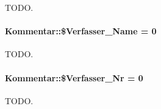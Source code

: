 TODO. 

\hypertarget{classKommentar_84f0fc10295968adde28169f8df018d9}{
\paragraph[\$Verfasser\_\-Name]{\setlength{\rightskip}{0pt plus 5cm}Kommentar::\$Verfasser\_\-Name = 0}\hfill}
\label{classKommentar_84f0fc10295968adde28169f8df018d9}


TODO. 

\hypertarget{classKommentar_c92b002e40690ee052fec446ff2a0ef6}{
\paragraph[\$Verfasser\_\-Nr]{\setlength{\rightskip}{0pt plus 5cm}Kommentar::\$Verfasser\_\-Nr = 0}\hfill}
\label{classKommentar_c92b002e40690ee052fec446ff2a0ef6}


TODO. 


